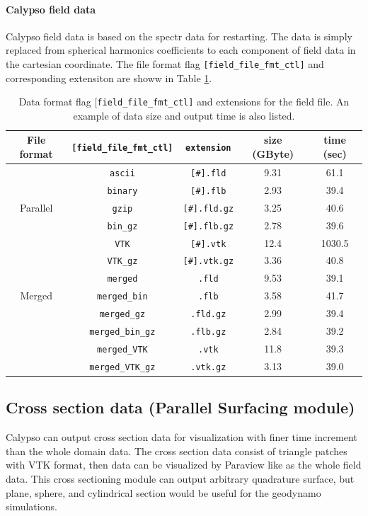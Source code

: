 \paragraph{Calypso field data}
Calypso field data is based on the spectr data for restarting. The data is simply replaced from spherical harmonics coefficients to each component of field data in the cartesian coordinate. The file format flag \verb|[field_file_fmt_ctl]| and corresponding extensiton are showw in Table \ref{table:field_format}.
%
%
\begin{table}[htp]
\caption{Data format flag {[\tt field\_file\_fmt\_ctl]} and extensions for the field file. An example of data size and output time is also listed.}
\begin{center} 
\begin{tabular}{|c|c|c|c|c|}
\hline
File format & \verb|[field_file_fmt_ctl]|  & \verb|extension| & size (GByte) & time (sec)  \\ \hline \hline
              &  \verb|ascii| & \verb|[#].fld|  & 9.31 & 61.1 \\
              &  \verb|binary| & \verb|[#].flb|  & 2.93 & 39.4  \\
Parallel  &  \verb|gzip| &  \verb|[#].fld.gz| & 3.25 &  40.6 \\
              &  \verb|bin_gz| &\verb|[#].flb.gz| & 2.78 &  39.6\\
              &  \verb|VTK| & \verb|[#].vtk|  & 12.4 & 1030.5 \\
              &  \verb|VTK_gz| & \verb|[#].vtk.gz|  & 3.36 & 40.8 \\ \hline
              & \verb|merged|  &  \verb|.fld| & 9.53 & 39.1 \\
 Merged &  \verb|merged_bin| &  \verb|.flb| & 3.58 & 41.7  \\
              &  \verb|merged_gz| &  \verb|.fld.gz| & 2.99 &  39.4  \\
              &  \verb|merged_bin_gz| &  \verb|.flb.gz| & 2.84 &  39.2 \\
              &  \verb|merged_VTK| & \verb|.vtk|  & 11.8 & 39.3 \\
              &  \verb|merged_VTK_gz| & \verb|.vtk.gz|  & 3.13 & 39.0 \\  \hline
\end{tabular}
\end{center}
\label{table:field_format}
\end{table}
%

%
\subsection{Cross section data (Parallel Surfacing module)}
\label{section:PSF}
Calypso can output cross section data for visualization with finer time increment than the whole domain data. The cross section data consist of triangle patches with VTK format, then data can be visualized by Paraview like as the whole field data. This cross sectioning module can output arbitrary quadrature surface, but plane, sphere, and cylindrical section would be useful for the geodynamo simulations.


